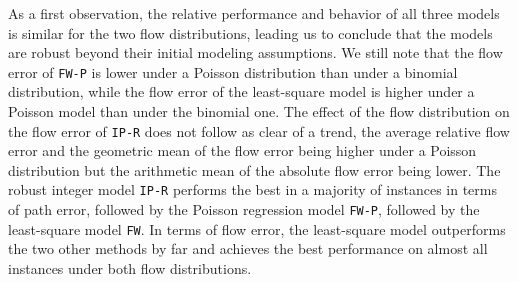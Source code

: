 \documentclass{ecai}
\begin{document}
As a first observation, the relative performance and behavior of all three models is similar for the two flow distributions, leading us to conclude that the models are robust beyond their initial modeling assumptions.
We still note that the flow error of \texttt{FW-P} is lower under a Poisson distribution than under a binomial distribution, while the flow error of the least-square model is higher under a Poisson model than under the binomial one.
The effect of the flow distribution on the flow error of \texttt{IP-R} does not follow as clear of a trend, the average relative flow error and the geometric mean of the flow error being higher under a Poisson distribution but the arithmetic mean of the absolute flow error being lower.
The robust integer model \texttt{IP-R} performs the best in a majority of instances in terms of path error, followed by the Poisson regression model \texttt{FW-P}, followed by the least-square model \texttt{FW}.
In terms of flow error, the least-square model outperforms the two other methods by far and achieves the best performance on almost all instances under both flow distributions.




\end{document}
